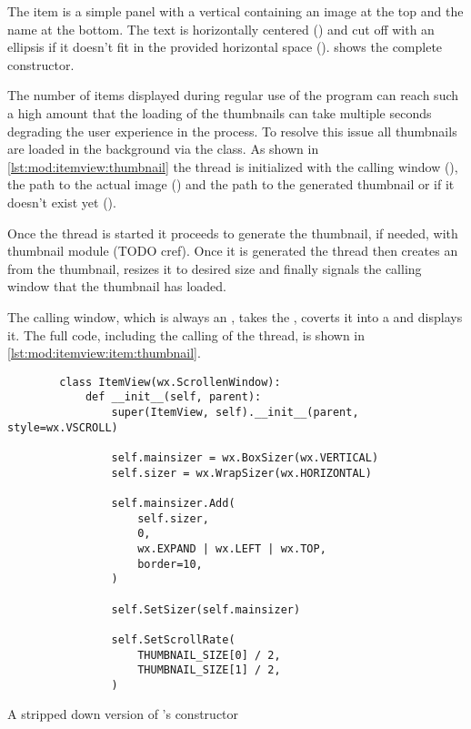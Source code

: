 \begin{sloppypar}
The item is a simple panel with a vertical  containing an
image at the top and the name at the bottom. The text is horizontally centered
() and cut off with an ellipsis if it
doesn't fit in the provided horizontal space ().  shows the complete
constructor.
\end{sloppypar}

The number of items displayed during regular use of the program can reach such
a high amount that the loading of the thumbnails can take multiple seconds
degrading the user experience in the process. To resolve this issue all
thumbnails are loaded in the background via the  class.
As shown in \cref{lst:mod:itemview:thumbnail} the thread is initialized with
the calling window (), the path to the actual image
() and the path to the generated thumbnail or  if it
doesn't exist yet ().

Once the thread is started it proceeds to generate the thumbnail, if needed,
with thumbnail module (TODO cref). Once it is generated the thread then creates
an  from the thumbnail, resizes it to desired size and finally
signals the calling window that the thumbnail has loaded.

The calling window, which is always an , takes the ,
coverts it into a  and displays it. The full code, including the
calling of the thread, is shown in \cref{lst:mod:itemview:item:thumbnail}.

\begin{listing}[p]
	\begin{verbatim}
		class ItemView(wx.ScrollenWindow):
			def __init__(self, parent):
				super(ItemView, self).__init__(parent, style=wx.VSCROLL)

				self.mainsizer = wx.BoxSizer(wx.VERTICAL)
				self.sizer = wx.WrapSizer(wx.HORIZONTAL)

				self.mainsizer.Add(
					self.sizer,
					0,
					wx.EXPAND | wx.LEFT | wx.TOP,
					border=10,
				)

				self.SetSizer(self.mainsizer)

				self.SetScrollRate(
					THUMBNAIL_SIZE[0] / 2,
					THUMBNAIL_SIZE[1] / 2,
				)
	\end{verbatim}
	\caption{A stripped down version of 's constructor}
	\label{lst:mod:itemview}
\end{listing}

